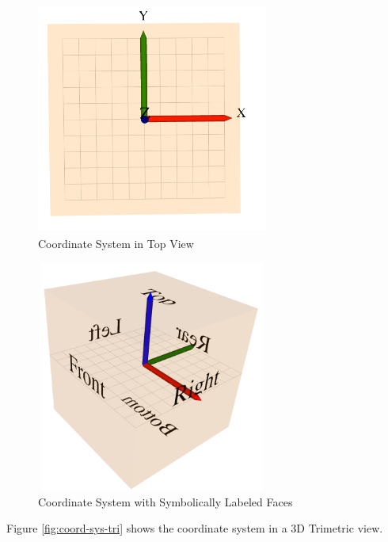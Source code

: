 \documentclass [11pt]{book}
\begin{document}
\begin{figure}
\begin{center}
\includegraphics[width=3in,height=3in]{../images/coord-sys-top.png}
\end{center}

\caption{Coordinate System in Top View}

\label{fig:coord-sys-top}

\end{figure}

\begin{figure}
\begin{center}
\includegraphics[width=3in,height=3in]{../images/coord-sys-labeled-faces.png}
\end{center}

\caption{Coordinate System with Symbolically Labeled Faces}

\label{fig:coord-sys-labeled-faces}

\end{figure}


Figure 
\ref{fig:coord-sys-tri} shows the coordinate system in a 3D Trimetric view.
\end{document}
